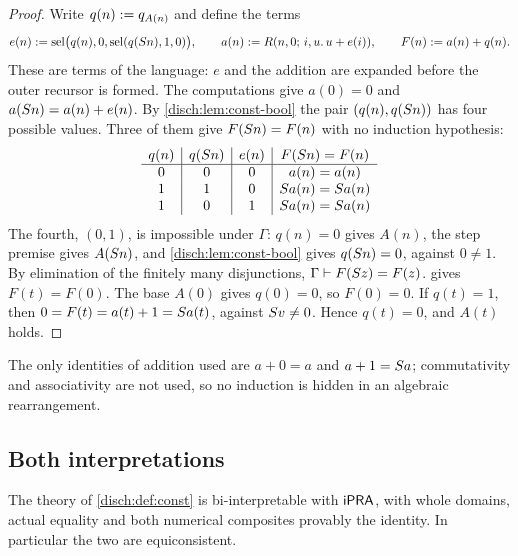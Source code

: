 \begin{proof}
Write $q(n)\mathrel{:=} q_{A(n)}$ and define the terms
\[
 e(n)\mathrel{:=}\operatorname{sel}\bigl(q(n),0,\operatorname{sel}(q(S n),1,0)\bigr),\qquad
 a(n)\mathrel{:=} R(n,0;\,i,u.\,u+e(i)),\qquad
 F(n)\mathrel{:=} a(n)+q(n).
\]
These are terms of the language: $e$ and the addition are expanded before
the outer recursor is formed. The computations give $a(0)=0$ and
$a(S n)=a(n)+e(n)$. By \cref{disch:lem:const-bool} the pair
$(q(n),q(S n))$ has four possible values. Three of them give
$F(S n)=F(n)$ with no induction hypothesis:
\[
 \begin{array}{c|c|c|c}
 q(n)&q(S n)&e(n)&F(S n)=F(n)\\ \hline
 0&0&0&a(n)=a(n)\\
 1&1&0&S a(n)=S a(n)\\
 1&0&1&S a(n)=S a(n)
 \end{array}
\]
The fourth, $(0,1)$, is impossible under $\Gamma$: $q(n)=0$ gives $A(n)$,
the step premise gives $A(S n)$, and \cref{disch:lem:const-bool} gives
$q(S n)=0$, against $0\neq 1$. By elimination of the finitely many
disjunctions, $\Gamma\vdash F(S z)=F(z)$.  gives
$F(t)=F(0)$. The base $A(0)$ gives $q(0)=0$, so $F(0)=0$. If $q(t)=1$,
then $0=F(t)=a(t)+1=S a(t)$, against $S v\neq 0$. Hence $q(t)=0$,
and $A(t)$ holds.
\end{proof}

The only identities of addition used are $a+0=a$ and $a+1=S a$;
commutativity and associativity are not used, so no induction is hidden in
an algebraic rearrangement.

\subsection{Both interpretations}

\begin{theorem}
\label{disch:thm:const-ipra}
The theory of \cref{disch:def:const} is bi-interpretable with $\mathsf{iPRA}$,
with whole domains, actual equality and both numerical composites provably
the identity. In particular the two are equiconsistent.
\end{theorem}

